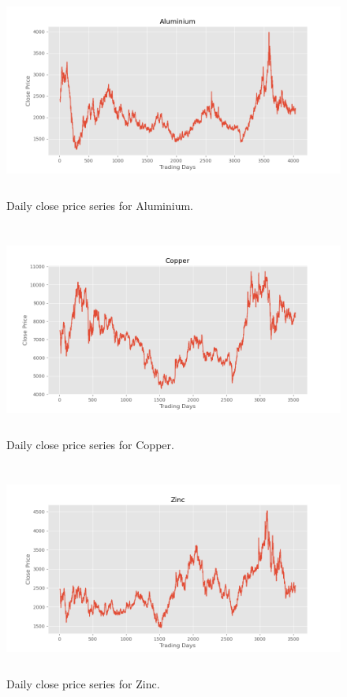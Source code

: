 \documentclass{ws-ijait}
\begin{document}
\begin{center}
	\begin{figure}[!htbp]
		\centering
		\includegraphics[width=15cm, height=7cm]{A.png}
		\caption{Daily close price series for Aluminium.}
		\label{fig:A}
	\end{figure}
\end{center}

\begin{center}
	\begin{figure}[!htbp]
		\centering
		\includegraphics[width=15cm, height=7cm]{Co.png}
		\caption{Daily close price series for Copper.}
		\label{fig:Co}
	\end{figure}
\end{center}

\begin{center}
	\begin{figure}[!htbp]
		\centering
		\includegraphics[width=15cm, height=7cm]{Z.png}
		\caption{Daily close price series for Zinc.}
		\label{fig:Z}
	\end{figure}
\end{center}
\end{document}
